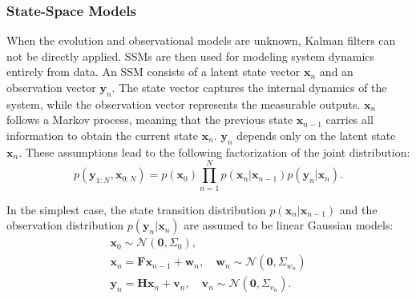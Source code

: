\subsubsection{State-Space Models}
When the evolution and observational models are unknown, Kalman filters can not be directly applied. \acfp{SSM} \citep{Durbin2012} are then used for modeling system dynamics entirely from data. An \ac{SSM} consists of a latent state vector $\boldsymbol{x}_n$ and an observation vector $\boldsymbol{y}_n$. The state vector captures the internal dynamics of the system, while the observation vector represents the measurable outputs. $\boldsymbol{x}_n$ follows a Markov process, meaning that the previous state $\boldsymbol{x}_{n-1}$ carries all information to obtain the current state $\boldsymbol{x}_n$. $\boldsymbol{y}_n$ depends only on the latent state $\boldsymbol{x}_n$. These assumptions lead to the following factorization of the joint distribution:
\begin{equation}
    p(\boldsymbol{y}_{1:N}, \boldsymbol{x}_{0:N}) = p(\boldsymbol{x}_0) \prod_{n=1}^{N}p(\boldsymbol{x}_n|\boldsymbol{x}_{n-1})p(\boldsymbol{y}_n|\boldsymbol{x}_n).
\end{equation}

In the simplest case, the state transition distribution $p(\boldsymbol{x}_n|\boldsymbol{x}_{n-1})$ and the observation distribution $p(\boldsymbol{y}_n|\boldsymbol{x}_n)$ are assumed to be linear Gaussian models:
\begin{subequations}
    \begin{gather}
        \boldsymbol{x}_0\sim\mathcal{N}(\boldsymbol{0}, \Sigma_0), \\
        \boldsymbol{x}_n=\boldsymbol{F}\boldsymbol{x}_{n-1}+\boldsymbol{w}_n, \quad \boldsymbol{w}_n\sim\mathcal{N}(\boldsymbol{0},\Sigma_{w_n})\\
        \boldsymbol{y}_n=\boldsymbol{H}\boldsymbol{x}_n+\boldsymbol{v}_n, \quad \boldsymbol{v}_n\sim\mathcal{N}(\boldsymbol{0},\Sigma_{v_n}).
    \end{gather}
\end{subequations}

